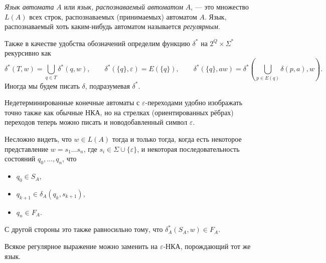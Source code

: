 \documentclass[12pt,a4paper]{article}
\begin{document}
\begin{definition}
        \emph{Язык автомата} $A$ или \emph{язык, распознаваемый автоматом} $A$, --- это множество $L(A)$ всех строк, распознаваемых (принимаемых) автоматом $A$. Язык, распознаваемый хоть каким-нибудь автоматом называется \emph{регулярным}.

        Также в качестве удобства обозначений определим функцию $\delta^*$ на $2^Q \times \Sigma^*$ рекурсивно как
        \[
            \delta^*(T, w) = \bigcup_{q \in T} \delta^*(q, w),
            \qquad
            \delta^*(\{q\}, \varepsilon) = E(\{q\}),
            \qquad
            \delta^*(\{q\}, aw) = \delta^*\left(\bigcup_{p \in E(q)} \delta(p, a), w\right).
        \]
        Иногда мы будем писать $\delta$, подразумевая $\delta^*$.
    \end{definition}

    \begin{remark*}
        Недетерминированные конечные автоматы с $\varepsilon$-переходами удобно изображать точно также как обычные НКА, но на стрелках (ориентированных рёбрах) переходов теперь можно писать и новодобавленный символ $\varepsilon$.
    \end{remark*}

    \begin{remark*}
        Несложно видеть, что $w \in L(A)$ тогда и только тогда, когда есть некоторое представление $w = s_1 \dots s_n$, где $s_i \in \Sigma \cup \{\varepsilon\}$, и некоторая последовательность состояний $q_0, \dots, q_n$, что
        \begin{itemize}
            \item $q_0 \in S_A$,
            \item $q_{k+1} \in \delta_A(q_k, s_{k+1})$,
            \item $q_n \in F_A$.
        \end{itemize}
        С другой стороны это также равносильно тому, что $\delta^*_A(S_A, w) \in F_A$.
    \end{remark*}

    \begin{lemma}
        Всякое регулярное выражение можно заменить на $\varepsilon$-НКА, порождающий тот же язык.
    \end{lemma}
\end{document}
